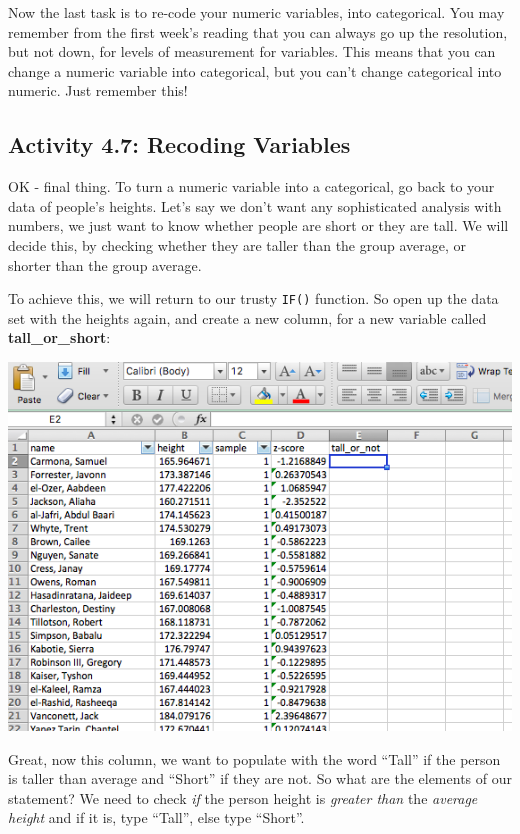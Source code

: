 \documentclass[
]{book}
\begin{document}
Now the last task is to re-code your numeric variables, into categorical. You may remember from the first week's reading that you can always go up the resolution, but not down, for levels of measurement for variables. This means that you can change a numeric variable into categorical, but you can't change categorical into numeric. Just remember this!

\hypertarget{activity-4.7-recoding-variables}{%
\subsection{Activity 4.7: Recoding Variables}\label{activity-4.7-recoding-variables}}

OK - final thing. To turn a numeric variable into a categorical, go back to your data of people's heights. Let's say we don't want any sophisticated analysis with numbers, we just want to know whether people are short or they are tall. We will decide this, by checking whether they are taller than the group average, or shorter than the group average.

To achieve this, we will return to our trusty \texttt{IF()} function. So open up the data set with the heights again, and create a new column, for a new variable called \textbf{tall\_or\_short}:

\includegraphics{imgs/tall_or_not_col.png}

Great, now this column, we want to populate with the word ``Tall'' if the person is taller than average and ``Short'' if they are not. So what are the elements of our statement? We need to check \emph{if} the person height is \emph{greater than} the \emph{average height} and if it is, type ``Tall'', else type ``Short''.
\end{document}
